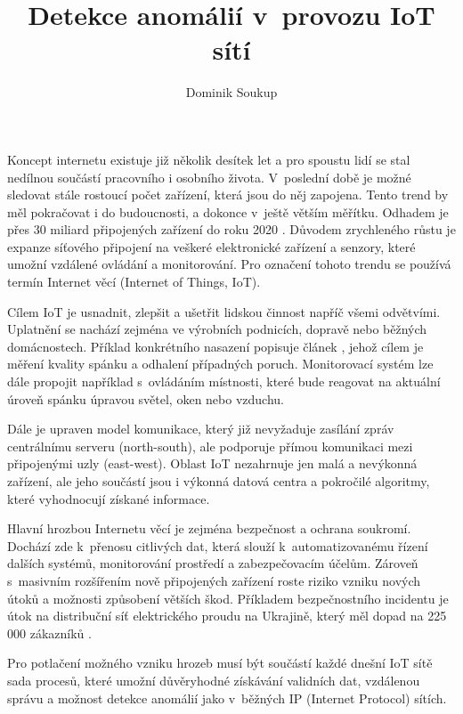 \documentclass[thesis=M,czech]{FITthesis}[2012/06/26]
\title{Detekce anomálií v~provozu IoT sítí}
\author{Dominik Soukup} %
\begin{document}

\begin{introduction}
Koncept internetu existuje již několik desítek let a pro spoustu lidí se stal 
nedílnou součástí pracovního i osobního života. V~poslední době je možné sledovat
stále rostoucí počet zařízení, která jsou do něj zapojena. Tento trend by měl
pokračovat i do budoucnosti, a dokonce v~ještě větším měřítku. Odhadem je 
přes 30 miliard připojených zařízení do roku 2020 \cite{iotDevices}.
Důvodem zrychleného
růstu je expanze síťového připojení na veškeré elektronické zařízení a senzory, 
které umožní vzdálené ovládání a monitorování. Pro označení tohoto trendu se používá
termín Internet věcí (Internet of Things, IoT).

Cílem IoT je usnadnit, zlepšit a ušetřit lidskou činnost napříč všemi odvětvími. 
Uplatnění se nachází zejména ve výrobních podnicích, dopravě nebo běžných domácnostech.
Příklad konkrétního nasazení popisuje článek \cite{sleeping}, jehož cílem je měření 
kvality spánku a odhalení případných poruch. Monitorovací systém lze dále 
propojit například s~ovládáním místnosti, které bude reagovat na aktuální úroveň spánku
úpravou světel, oken nebo vzduchu.

Dále je upraven model komunikace, který již nevyžaduje zasílání zpráv centrálnímu 
serveru (north-south), ale podporuje přímou komunikaci mezi připojenými uzly (east-west).
Oblast IoT nezahrnuje jen malá a nevýkonná zařízení, ale jeho součástí jsou i 
výkonná datová centra a pokročilé algoritmy, které vyhodnocují získané informace.

Hlavní hrozbou Internetu věcí je zejména bezpečnost a ochrana soukromí. Dochází zde k~přenosu
citlivých dat, která slouží
k~automatizovanému řízení dalších
systémů, monitorování prostředí a zabezpečovacím účelům. Zároveň s~masivním rozšířením nově
připojených zařízení roste riziko vzniku nových útoků a možnosti způsobení větších
škod. Příkladem bezpečnostního incidentu je útok na distribuční síť elektrického 
proudu na Ukrajině, který měl dopad na 225 000 zákazníků \cite{ukraine}. 

Pro potlačení možného vzniku hrozeb musí být součástí každé dnešní IoT sítě sada procesů,
které umožní důvěryhodné
získávání validních dat, vzdálenou správu a možnost
detekce anomálií jako v~běžných IP (Internet Protocol) sítích. 	
\end{introduction}
\end{document}

